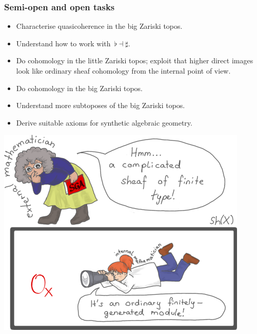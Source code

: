\documentclass[12pt,utf8,notheorems,compress,t]{beamer}
\renewcommand{\_}{\mathpunct{.}}
\newcommand{\?}{\,{:}\,}
\newcounter{framenumberpreappendix}
\newcommand{\backupstart}{
  \setcounter{framenumberpreappendix}{\value{framenumber}}
}
\begin{document}
\begin{frame}\frametitle{Semi-open and open tasks}
  \begin{itemize}
  \item Characterise quasicoherence in the big Zariski topos.
  \item Understand how to work with~${\flat} \dashv \sharp$.
  \item Do cohomology in the little Zariski topos; exploit that higher direct
  images look like ordinary sheaf cohomology from the internal point of view.
  \item Do cohomology in the big Zariski topos.
  \item Understand more subtoposes of the big Zariski topos.
  \item Derive suitable axioms for synthetic algebraic geometry.
  \end{itemize}

  {\vspace{-0.1em}\centering
  \hspace{-0.05cm}%
  \includegraphics[scale=0.20]{images/external-internal-small}
  \par\medskip\vspace{-0.1em}}
\end{frame}

\backupstart
\end{document}
